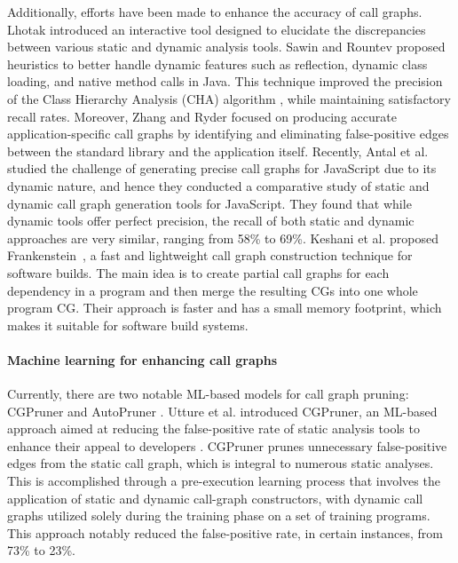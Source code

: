 Additionally, efforts have been made to enhance the accuracy of call graphs. Lhotak \cite{lhotak2007comparing} introduced an interactive tool designed to elucidate the discrepancies between various static and dynamic analysis tools. Sawin and Rountev \cite{sawin2011assumption} proposed heuristics to better handle dynamic features such as reflection, dynamic class loading, and native method calls in Java. This technique improved the precision of the Class Hierarchy Analysis (CHA) algorithm \cite{dean1995optimization}, while maintaining satisfactory recall rates. Moreover, Zhang and Ryder \cite{zhang2007automatic} focused on producing accurate application-specific call graphs by identifying and eliminating false-positive edges between the standard library and the application itself. Recently, Antal et al.~\cite{antal2023javascript} studied the challenge of generating precise call graphs for JavaScript due to its dynamic nature, and hence they conducted a comparative study of static and dynamic call graph generation tools for JavaScript. They found that while dynamic tools offer perfect precision, the recall of both static and dynamic approaches are very similar, ranging from 58\% to 69\%. Keshani et al. proposed Frankenstein~\cite{keshani2024frankenstein}, a fast and lightweight call graph construction technique for software builds. The main idea is to create partial call graphs for each dependency in a program and then merge the resulting CGs into one whole program CG. Their approach is faster and has a small memory footprint, which makes it suitable for software build systems.

\paragraph{Machine learning for enhancing call graphs}
Currently, there are two notable ML-based models for call graph pruning: CGPruner \cite{utture2022striking} and AutoPruner \cite{le2022autopruner}. Utture et al. introduced CGPruner, an ML-based approach aimed at reducing the false-positive rate of static analysis tools to enhance their appeal to developers \cite{utture2022striking}. CGPruner prunes unnecessary false-positive edges from the static call graph, which is integral to numerous static analyses. This is accomplished through a pre-execution learning process that involves the application of static and dynamic call-graph constructors, with dynamic call graphs utilized solely during the training phase on a set of training programs. This approach notably reduced the false-positive rate, in certain instances, from 73\% to 23\%.

